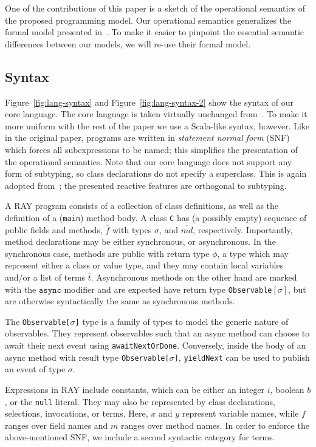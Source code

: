 \documentclass{acm_proc_article-sp}
\newcommand{\seq}[1]{\overline{#1}}
\begin{document}
One of the contributions of this paper is a sketch of the operational semantics of the
proposed programming model. Our operational semantics generalizes the formal
model presented in~\cite{FormalizingAsync}. To make it easier to pinpoint the essential
semantic differences between our models, we will re-use their formal model.

\subsection{Syntax}

Figure~\ref{fig:lang-syntax} and Figure~\ref{fig:lang-syntax-2} show the
syntax of our core language. The core language is taken virtually unchanged
from~\cite{FormalizingAsync}. To make it more uniform with the rest of the
paper we use a Scala-like syntax, however. Like in the original paper, programs
are written in {\em statement normal form} (SNF) which forces all
subexpressions to be named; this simplifies the presentation of the
operational semantics. Note that our core language does not support any form
of subtyping, so class declarations do not specify a superclass. This is again
adopted from~\cite{FormalizingAsync}; the presented reactive features are
orthogonal to subtyping.

A RAY program consists of a collection of class definitions, as well as the
definition of a (\texttt{main}) method body. A class \texttt{C} has (a
possibly empty) sequence of  public fields and methods, $\seq{f}$ with types
$\sigma$, and $\seq{md}$, respectively. Importantly, method declarations may be
either synchronous, or asynchronous. In the synchronous case, methods are
public with return type $\phi$, a type which may represent either a class or
value type, and they may contain local variables and/or a list of terms
$\seq{t}$. Asynchronous methods on the other hand are marked with the
$\texttt{async}$ modifier and are expected have return type
\texttt{Observable$[\sigma]$}, but are otherwise syntactically the same
as synchronous methods.

The \texttt{Observable[$\sigma$]} type is a family of types to model the
generic nature of observables. They represent observables such that an async
method can choose to await their next event using \texttt{awaitNextOrDone}.
Conversely, inside the body of an async method with result type
\texttt{Observable[$\sigma$]}, \texttt{yieldNext} can be used to publish an
event of type $\sigma$.

Expressions in RAY include constants, which can be either an integer $i$,
boolean $b$, or the \texttt{null} literal. They may also be represented by
class declarations, selections, invocations, or terms. Here, $x$ and $y$
represent variable names, while $f$ ranges over field names and $m$ ranges
over method names. In order to enforce the above-mentioned SNF, we include a
second syntactic category for terms.
\end{document}
